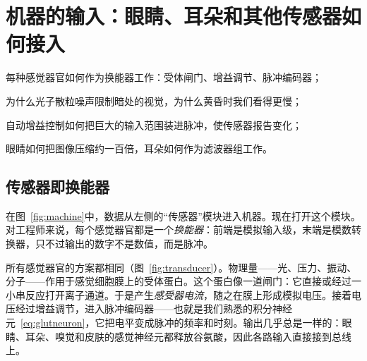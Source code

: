 \chapter{机器的输入：眼睛、耳朵和其他传感器如何接入}
\label{sec:sensors}
\begin{chaptergoals}
\item 每种感觉器官如何作为换能器工作：受体闸门、增益调节、脉冲编码器；
\item 为什么光子散粒噪声限制暗处的视觉，为什么黄昏时我们看得更慢；
\item 自动增益控制如何把巨大的输入范围装进脉冲，使传感器报告变化；
\item 眼睛如何把图像压缩约一百倍，耳朵如何作为滤波器组工作。
\end{chaptergoals}

\section{传感器即换能器}

在图~\ref{fig:machine}中，数据从左侧的“传感器”模块进入机器。现在打开这个模块。对工程师来说，每个感觉器官都是一个\emph{换能器}：前端是模拟输入级，末端是模数转换器，只不过输出的数字不是数值，而是脉冲。

所有感觉器官的方案都相同（图~\ref{fig:transducer}）。物理量——光、压力、振动、分子——作用于感觉细胞膜上的受体蛋白。这个蛋白像一道闸门：它直接或经过一小串反应打开离子通道。于是产生\emph{感受器电流}，随之在膜上形成模拟电压。接着电压经过增益调节，进入脉冲编码器——也就是我们熟悉的积分神经元~\eqref{eq:glutneuron}，它把电平变成脉冲的频率和时刻。输出几乎总是一样的：眼睛、耳朵、嗅觉和皮肤的感觉神经元都释放谷氨酸，因此各路输入直接接到总线上。

